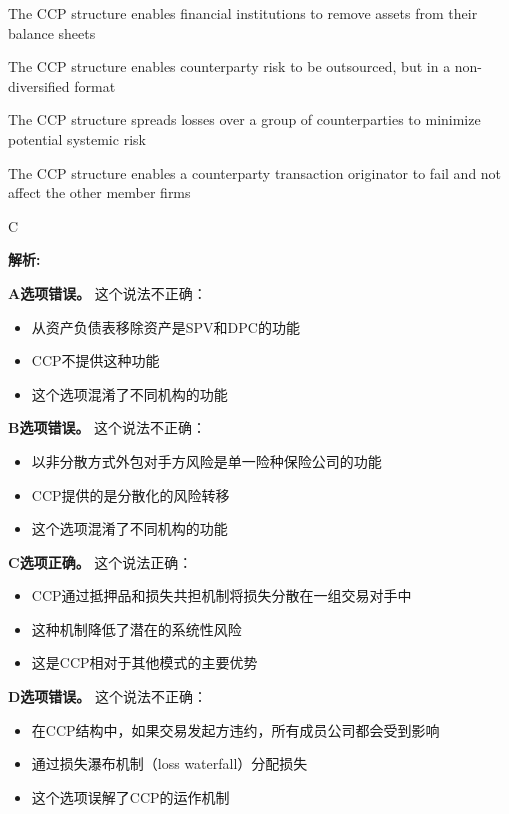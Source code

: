 \documentclass{article}
\newenvironment{explanation}
{\textbf{解析:}\par}
{\par}
\begin{document}
\begin{choices}
    \item The CCP structure enables financial institutions to remove assets from their balance sheets
    \item The CCP structure enables counterparty risk to be outsourced, but in a non-diversified format
    \item The CCP structure spreads losses over a group of counterparties to minimize potential systemic risk
    \item The CCP structure enables a counterparty transaction originator to fail and not affect the other member firms
\end{choices}

\begin{correctanswer}
    C
\end{correctanswer}

\begin{explanation}
    \textbf{A选项错误。}
    这个说法不正确：
    \begin{itemize}
        \item 从资产负债表移除资产是SPV和DPC的功能
        \item CCP不提供这种功能
        \item 这个选项混淆了不同机构的功能
    \end{itemize}

    \textbf{B选项错误。}
    这个说法不正确：
    \begin{itemize}
        \item 以非分散方式外包对手方风险是单一险种保险公司的功能
        \item CCP提供的是分散化的风险转移
        \item 这个选项混淆了不同机构的功能
    \end{itemize}

    \textbf{C选项正确。}
    这个说法正确：
    \begin{itemize}
        \item CCP通过抵押品和损失共担机制将损失分散在一组交易对手中
        \item 这种机制降低了潜在的系统性风险
        \item 这是CCP相对于其他模式的主要优势
    \end{itemize}

    \textbf{D选项错误。}
    这个说法不正确：
    \begin{itemize}
        \item 在CCP结构中，如果交易发起方违约，所有成员公司都会受到影响
        \item 通过损失瀑布机制（loss waterfall）分配损失
        \item 这个选项误解了CCP的运作机制
    \end{itemize}
\end{explanation}
\end{document}
